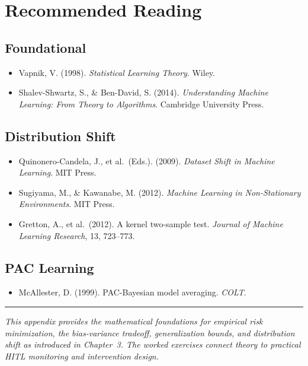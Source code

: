 \section{Recommended Reading}

\subsection*{Foundational}
\begin{itemize}
    \item Vapnik, V. (1998). \textit{Statistical Learning Theory}. Wiley.
    \item Shalev-Shwartz, S., \& Ben-David, S. (2014). \textit{Understanding Machine Learning: From Theory to Algorithms}. Cambridge University Press.
\end{itemize}

\subsection*{Distribution Shift}
\begin{itemize}
    \item Quinonero-Candela, J., et al.\ (Eds.). (2009). \textit{Dataset Shift in Machine Learning}. MIT Press.
    \item Sugiyama, M., \& Kawanabe, M. (2012). \textit{Machine Learning in Non-Stationary Environments}. MIT Press.
    \item Gretton, A., et al.\ (2012). A kernel two-sample test. \textit{Journal of Machine Learning Research}, 13, 723--773.
\end{itemize}

\subsection*{PAC Learning}
\begin{itemize}
    \item McAllester, D. (1999). PAC-Bayesian model averaging. \textit{COLT}.
\end{itemize}

\bigskip
\begin{center}
\rule{0.5\textwidth}{0.4pt}
\end{center}
\bigskip

\noindent\textit{This appendix provides the mathematical foundations for empirical risk minimization, the bias-variance tradeoff, generalization bounds, and distribution shift as introduced in Chapter~3. The worked exercises connect theory to practical HITL monitoring and intervention design.}
\apxnumoff
